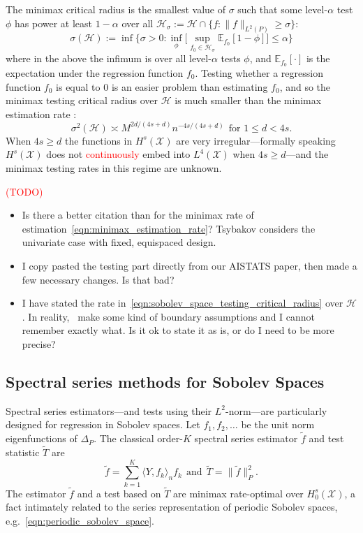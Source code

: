 \documentclass{article}
\newcommand{\1}{\mathbf{1}}
\newcommand{\Xset}{\mathcal{X}}
\newcommand{\Leb}{L}
\newcommand{\mc}[1]{\mathcal{#1}}
\newcommand{\Ebb}{\mathbb{E}}
\newcommand{\dotp}[2]{\langle #1, #2 \rangle}
\newcommand{\wt}[1]{\widetilde{#1}}
\theoremstyle{alden}
\theoremstyle{aldenthm}
\theoremstyle{definition}
\theoremstyle{remark}
\begin{document}
The minimax critical radius is the smallest value of $\sigma$ such that some level-${\alpha}$ test $\phi$ has power at least $1 - \alpha$ over all $\mc{H}_{\sigma} := \mc{H} \cap \{f: \|f\|_{\Leb^2(P)} \geq \sigma\}$:
\begin{equation*}
\sigma(\mc{H}) := \inf\Biggl\{\sigma > 0: \inf_{\phi} \biggl[ \sup_{f_0 \in \mc{H}_{\sigma}} \Ebb_{f_0}[1 - \phi]\biggr] \leq \alpha\Biggr\}
\end{equation*} 
where in the above the infimum is over all level-$\alpha$ tests $\phi$, and $\Ebb_{f_0}[\cdot]$ is the expectation under the regression function $f_0$. Testing whether a regression function $f_0$ is equal to $0$ is an easier problem than estimating $f_0$, and so the minimax testing critical radius over $\mc{H}$ is much smaller than the minimax estimation rate \citep{ingster2009}:
\begin{equation}
\label{eqn:sobolev_space_testing_critical_radius}
\sigma^2(\mc{H}) \asymp M^{2d/(4s + d)}n^{-4s/(4s + d)}~~\textrm{for $1 \leq d < 4s$.}
\end{equation}
When $4s \geq d$ the functions in $H^s(\Xset)$ are very irregular---formally speaking $H^s(\Xset)$ does not \textcolor{red}{continuously} embed into $\Leb^4(\Xset)$ when $4s \geq d$---and the minimax testing rates in this regime are unknown.

\textcolor{red}{(TODO)}
\begin{itemize}
	\item Is there a better citation than \citet{tsybakov2008_book} for the minimax rate of estimation~\eqref{eqn:minimax_estimation_rate}? Tsybakov considers the univariate case with fixed, equispaced design.
	\item I copy pasted the testing part directly from our AISTATS paper, then made a few necessary changes. Is that bad?
	\item I have stated the rate in~\eqref{eqn:sobolev_space_testing_critical_radius} over $\mc{H}$. In reality,~\citep{ingster2009} make some kind of boundary assumptions and I cannot remember exactly what. Is it ok to state it as is, or do I need to be more precise?
\end{itemize}

\subsection{Spectral series methods for Sobolev Spaces}
Spectral series estimators---and tests using their $\Leb^2$-norm---are particularly designed for regression in Sobolev spaces. Let $f_1,f_2,\ldots$ be the unit norm eigenfunctions of $\Delta_P$. The classical order-$K$ spectral series estimator $\wt{f}$ and test statistic $\wt{T}$ are
\begin{equation*}
\wt{f} = \sum_{k = 1}^{K} \dotp{Y}{f_k}_n f_k~~\textrm{and}~~\wt{T} = \|\wt{f}\|_P^2.
\end{equation*}
The estimator $\wt{f}$ and a test based on $\wt{T}$ are minimax rate-optimal over $H_0^s(\mc{X})$, a fact intimately related to the series representation of periodic Sobolev spaces, e.g.~\eqref{eqn:periodic_sobolev_space}. 
\end{document}
